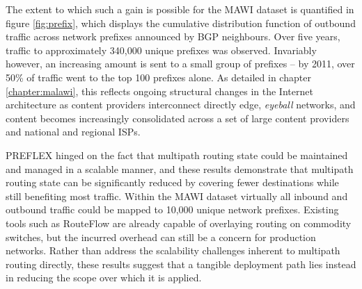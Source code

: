 The extent to which such a gain is possible for the \ac{MAWI} dataset is quantified in figure \ref{fig:prefix}, which displays the cumulative distribution function of outbound traffic across network prefixes announced by \ac{BGP} neighbours.
Over five years, traffic to approximately 340,000 unique prefixes was observed.
Invariably however, an increasing amount is sent to a small group of prefixes -- by 2011, over 50\% of traffic went to the top 100 prefixes alone.
As detailed in chapter \ref{chapter:malawi}, this reflects ongoing structural changes in the Internet architecture as content providers interconnect directly edge, \emph{eyeball} networks, and content becomes increasingly consolidated across a set of large content providers and national and regional ISPs.

\ac{PREFLEX} hinged on the fact that multipath routing state could be maintained and managed in a scalable manner, and these results demonstrate that multipath routing state can be significantly reduced by covering fewer destinations while still benefiting most traffic.
Within the \ac{MAWI} dataset virtually all inbound and outbound traffic could be mapped to 10,000 unique network prefixes. 
Existing tools such as RouteFlow \cite{Rothenberg:2012:RRC:2342441.2342445} are already capable of overlaying routing on commodity switches, but the incurred overhead can still be a concern for production networks.
Rather than address the scalability challenges inherent to multipath routing directly, these results suggest that a tangible deployment path lies instead in reducing the scope over which it is applied.

